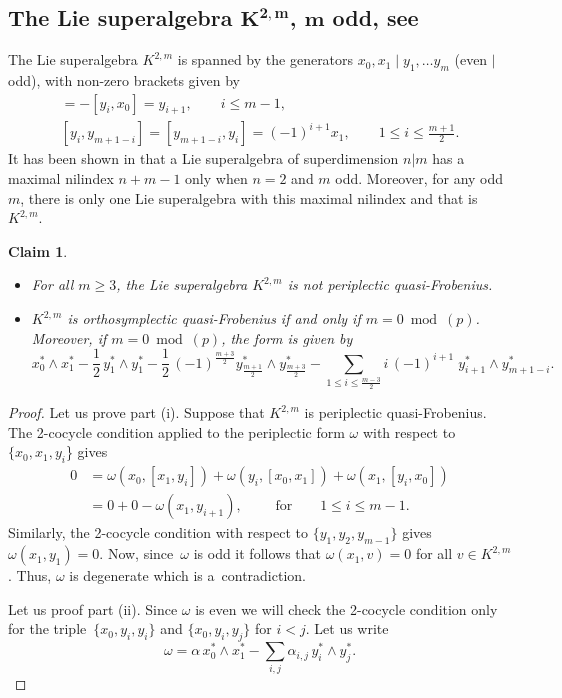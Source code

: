 \documentclass[10pt,a4paper]{amsart}
\numberwithin{equation}{section}
\newtheorem{Claim}[Theorem]{Claim}
\begin{document}
\subsection[The Lie superalgebra K\^{}\{2,m\}, m odd, see \protect{[28]}]{The Lie superalgebra $\boldsymbol{K^{2,m}}$, $\boldsymbol{m}$ odd, see \cite{GKN}}
The Lie superalgebra $K^{2,m}$ is spanned by the generators $x_0, x_1\mid y_1,\ldots y_m$ (even $|$ odd), with non-zero brackets given by
\begin{gather*}
[x_0, y_i] = -[y_i, x_0] = y_{i+1},\qquad i\leq m-1, \\
[y_i, y_{m+1-i}] = [ y_{m+1-i}, y_i] = (-1)^{i+1}x_1, \qquad 1 \leq i\leq \frac{m+1}{2}.
\end{gather*}
It has been shown in \cite{GKN} that a Lie superalgebra of superdimension $n|m$ has a maximal nilindex $n + m-1$ only when $n=2$ and $m$ odd. Moreover, for any odd $m$, there is only one Lie superalgebra with this maximal nilindex and that is $K^{2,m}$.
\begin{Claim}\qquad
\begin{itemize}\itemsep=0pt
\item[$(i)$] For all $m\geq 3$, the Lie superalgebra $K^{2,m}$ is not periplectic quasi-Frobenius.
\item[$(ii)$] $K^{2,m}$ is orthosymplectic quasi-Frobenius if and only if $m=0 \bmod(p)$. Moreover, if ${m=0} \bmod(p)$, the form is given by
\[
x_0^* \wedge x_1^* - \frac{1}{2}\,y_1^* \wedge y_1^*- \frac{1}{2}\,(-1)^{\frac{m+3}{2}}y_{\frac{m+1}{2}}^* \wedge y_{\frac{m+3}{2}}^* - \sum_{1\leq i \leq \frac{m-3}{2}} i \, (-1)^{i+1}\; y_{i+1}^* \wedge y_{m+1-i}^*.
\]
\end{itemize}
\end{Claim}
\begin{proof} Let us prove part (i). Suppose that $K^{2,m}$ is periplectic quasi-Frobenius. The 2-cocycle condition applied to the periplectic form $\omega$ with respect to $\{x_0, x_1, y_i$\} gives
\begin{align*}
0&=\omega(x_0, [x_1, y_i])+ \omega (y_i, [x_0,x_1])+\omega (x_1, [y_i, x_0])\\
&=0+0-\omega(x_1, y_{i+1}), \qquad \text{ for}\qquad 1\leq i \leq m-1.
\end{align*}
Similarly, the 2-cocycle condition with respect to $\{y_1, y_2, y_{m-1} \}$ gives $\omega(x_1,y_1)=0$. Now, since~$\omega$ is odd it follows that $\omega(x_1, v)=0$ for all $v \in K^{2,m}$. Thus, $\omega$ is degenerate which is a~contradiction.

Let us proof part (ii). Since $\omega$ is even we will check the 2-cocycle condition only for the triple~$\{x_0, y_i, y_i\}$ and $\{x_0, y_i, y_j\}$ for $i<j$. Let us write
\[
\omega= \alpha \, x^*_0\wedge x^*_1 - \sum_{i,j} \alpha_{i,j} \, y^*_i \wedge y^*_j.\tag*{\qed}
\]\renewcommand{\qed}{}
\end{proof}
\end{document}

